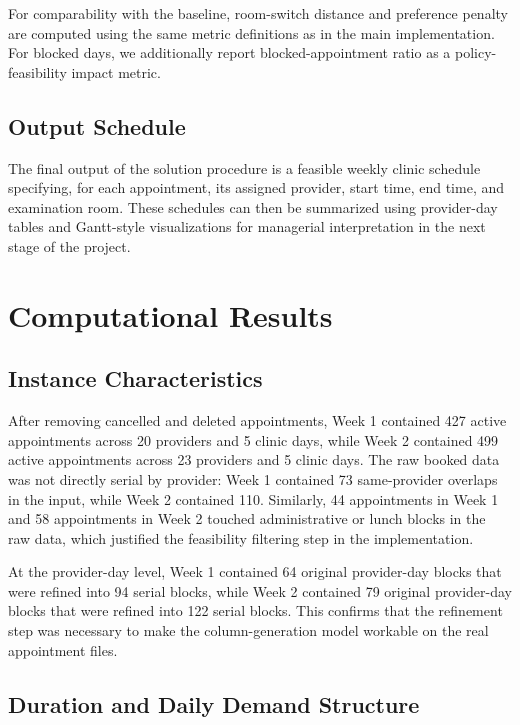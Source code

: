 \documentclass[12pt]{article}
\begin{document}
For comparability with the baseline, room-switch distance and preference penalty are computed
using the same metric definitions as in the main implementation. For blocked days, we additionally
report blocked-appointment ratio as a policy-feasibility impact metric.

\subsection*{Output Schedule}

The final output of the solution procedure is a feasible weekly clinic schedule specifying, for
each appointment, its assigned provider, start time, end time, and examination room. These
schedules can then be summarized using provider-day tables and Gantt-style visualizations for
managerial interpretation in the next stage of the project.

\section{Computational Results}

\subsection*{Instance Characteristics}

After removing cancelled and deleted appointments, Week 1 contained 427 active appointments
across 20 providers and 5 clinic days, while Week 2 contained 499 active appointments across 23
providers and 5 clinic days. The raw booked data was not directly serial by provider: Week 1
contained 73 same-provider overlaps in the input, while Week 2 contained 110. Similarly, 44
appointments in Week 1 and 58 appointments in Week 2 touched administrative or lunch blocks
in the raw data, which justified the feasibility filtering step in the implementation.

At the provider-day level, Week 1 contained 64 original provider-day blocks that were refined
into 94 serial blocks, while Week 2 contained 79 original provider-day blocks that were refined
into 122 serial blocks. This confirms that the refinement step was necessary to make the
column-generation model workable on the real appointment files.

\subsection*{Duration and Daily Demand Structure}
\end{document}
